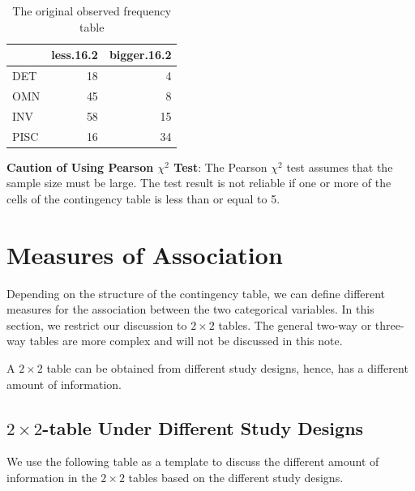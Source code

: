 \documentclass[
]{book}
\begin{document}
\begin{table}

\caption{\label{tab:unnamed-chunk-197}The original observed frequency table}
\centering
\begin{tabular}[t]{l|r|r}
\hline
  & less.16.2 & bigger.16.2\\
\hline
DET & 18 & 4\\
\hline
OMN & 45 & 8\\
\hline
INV & 58 & 15\\
\hline
PISC & 16 & 34\\
\hline
\end{tabular}
\end{table}

\newpage

\textbf{Caution of Using Pearson \(\chi^2\) Test}: The Pearson \(\chi^2\) test assumes that the sample size must be large. The test result is not reliable if one or more of the cells of the contingency table is less than or equal to 5.

\hypertarget{measures-of-association}{%
\section{Measures of Association}\label{measures-of-association}}

Depending on the structure of the contingency table, we can define different measures for the association between the two categorical variables. In this section, we restrict our discussion to \(2\times2\) tables. The general two-way or three-way tables are more complex and will not be discussed in this note.

A \(2\times2\) table can be obtained from different study designs, hence, has a different amount of information.

\hypertarget{times2-table-under-different-study-designs}{%
\subsection{\texorpdfstring{\(2\times2\)-table Under Different Study Designs}{2\textbackslash times2-table Under Different Study Designs}}\label{times2-table-under-different-study-designs}}

We use the following table as a template to discuss the different amount of information in the \(2\times2\) tables based on the different study designs.
\end{document}
